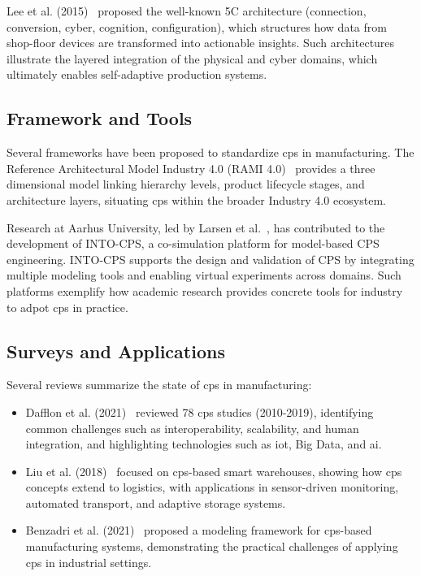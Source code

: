 Lee et al. (2015)~\cite{LEE-2015-a-cps-for-indsutry40-based-manufacturing-systems} proposed the well-known 5C architecture (connection, conversion, cyber, cognition, configuration), which structures how data from shop-floor devices are transformed into actionable insights.
Such architectures illustrate the layered integration of the physical and cyber domains, which ultimately enables self-adaptive production systems.

\subsection{Framework and Tools}

Several frameworks have been proposed to standardize \ac{cps} in manufacturing.
The Reference Architectural Model Industry 4.0 (RAMI 4.0)~\cite{Schweichhart2015RAMI4.0} provides a three dimensional model linking hierarchy levels, product lifecycle stages, and architecture layers, situating \ac{cps} within the broader Industry 4.0 ecosystem.

Research at Aarhus University, led by Larsen et al.~\cite{larsen-et-al-into-cps}, has contributed to the development of INTO-CPS, a co-simulation platform for model-based CPS engineering. INTO-CPS supports the design and validation of CPS by integrating multiple modeling tools and enabling virtual experiments across domains.
Such platforms exemplify how academic research provides concrete tools for industry to adpot \ac{cps} in practice.

\subsection{Surveys and Applications}

Several reviews summarize the state of \ac{cps} in manufacturing:

\begin{itemize}
    \item Dafflon et al. (2021)~\cite{dafflon-the-challenges-approaches} reviewed 78 \ac{cps} studies (2010-2019), identifying common challenges such as interoperability, scalability, and human integration, and highlighting technologies such as \ac{iot}, Big Data, and \ac{ai}.
    \item Liu et al. (2018)~\cite{liu-cps-based-smart-warehouse} focused on \ac{cps}-based smart warehouses, showing how \ac{cps} concepts extend to logistics, with applications in sensor-driven monitoring, automated transport, and adaptive storage systems.
    \item Benzadri et al. (2021)~\cite{benzadri-a-modelling-framework-for-cps-based-industry} proposed a modeling framework for \ac{cps}-based manufacturing systems, demonstrating the practical challenges of applying \ac{cps} in industrial settings.
\end{itemize}

